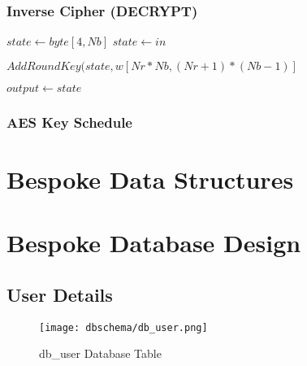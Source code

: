 \subsubsection{Inverse Cipher (DECRYPT)}

\begin{algorithm}[H]
\begin{algorithmic}


\STATE $state \leftarrow byte[4,Nb]$
\STATE $state \leftarrow in$

\vspace{1em}
\STATE $AddRoundKey(state, w[Nr*Nb, (Nr+1)*(Nb-1)]$

\ENDFOR
\vspace{1em}
\STATE{$AddRoundKey(state, w[0, Nb-1)$}

\vspace{1em}
\STATE $output \leftarrow state$
\vspace{1em}
\end{algorithmic}
\end{algorithm}

\subsubsection{AES Key Schedule}



\section{Bespoke Data Structures}

\newpage
\section{Bespoke Database Design}

\subsection{User Details}

\begin{figure}[H]
\begin{center}
\texttt{[image: dbschema/db\_user.png]}
\end{center}
\caption{ db\_user Database Table}
\label{db_user_table}
\end{figure}

